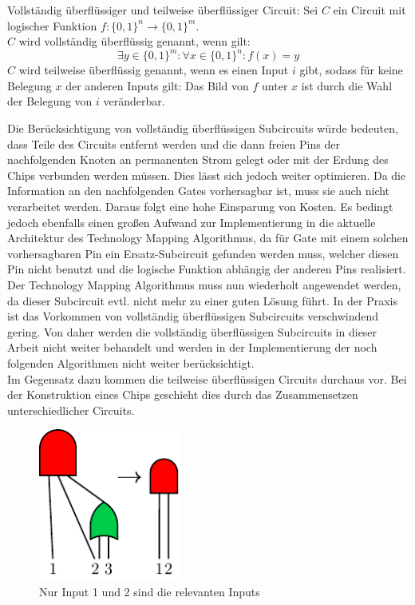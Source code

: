 \documentclass[11pt, a4paper, german]{article}
\newcommand{\TM}{Technology  Mapping }
\begin{document}
 \begin{definition}{Vollständig überflüssiger und teilweise überflüssiger Circuit: }
 	Sei $C$ ein Circuit mit logischer Funktion $ f : \{ 0 , 1 \}^n \rightarrow \{ 0 , 1 \}^m $.\\
 	$C$ wird vollständig überflüssig genannt, wenn gilt:
 	\[  \exists y \in \{0,1 \}^m :\forall x \in \{ 0, 1\}^n : f(x) = y  \]
 	$C$ wird teilweise überflüssig genannt, wenn es einen Input $i$ gibt, sodass für keine Belegung $x$ der anderen Inputs gilt: Das Bild von $f$ unter $x$ ist durch die Wahl der Belegung von $i$ veränderbar.
 \end{definition}
 
Die Berücksichtigung von vollständig überflüssigen Subcircuits würde bedeuten, dass Teile des Circuits entfernt werden und die dann freien Pins der nachfolgenden Knoten an permanenten Strom gelegt oder mit der Erdung des Chips verbunden werden müssen. Dies lässt sich jedoch weiter optimieren. Da die Information an den nachfolgenden Gates vorhersagbar ist, muss sie auch nicht verarbeitet werden. Daraus folgt eine hohe Einsparung von Kosten. Es bedingt jedoch ebenfalls einen großen Aufwand zur Implementierung in die aktuelle Architektur des \TM Algorithmus, da f\"ur Gate mit einem solchen vorhersagbaren Pin ein Ersatz-Subcircuit gefunden werden muss, welcher diesen Pin nicht benutzt und die logische Funktion abh\"angig der anderen Pins realisiert. Der \TM Algorithmus muss nun wiederholt angewendet werden, da dieser Subcircuit evtl. nicht mehr zu einer guten L\"osung f\"uhrt. In der Praxis ist das Vorkommen von  vollständig überflüssigen Subcircuits verschwindend gering. Von daher werden die vollständig überflüssigen Subcircuits in dieser Arbeit nicht weiter behandelt und werden in der Implementierung der noch folgenden Algorithmen nicht weiter berücksichtigt. \\
Im Gegensatz dazu kommen die teilweise überflüssigen Circuits durchaus vor. Bei der Konstruktion eines Chips geschieht dies durch das Zusammensetzen unterschiedlicher Circuits.\\
 \begin{figure}
		\includegraphics[height = 5cm]{pictures/compiled/partly_redundant}
		\caption{Nur Input 1 und 2 sind die relevanten Inputs}
		\label{bild:partly_redundant}
\end{figure}
\end{document}
